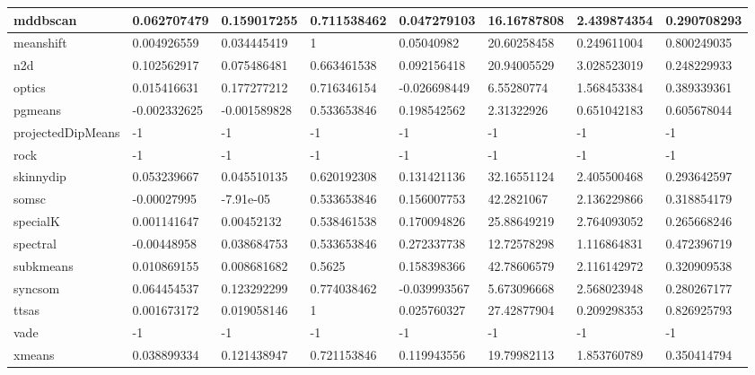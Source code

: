 \begin{table}[H]
\begin{tabular}{|l|l|l|l|l|l|l|l|}
mddbscan & 0.062707479 & 0.159017255 & 0.711538462 & 0.047279103 & 16.16787808 & 2.439874354 & 0.290708293 \\
\hline
meanshift & 0.004926559 & 0.034445419 & 1 & 0.05040982 & 20.60258458 & 0.249611004 & 0.800249035 \\
\hline
n2d & 0.102562917 & 0.075486481 & 0.663461538 & 0.092156418 & 20.94005529 & 3.028523019 & 0.248229933 \\
\hline
optics & 0.015416631 & 0.177277212 & 0.716346154 & -0.026698449 & 6.55280774 & 1.568453384 & 0.389339361 \\
\hline
pgmeans & -0.002332625 & -0.001589828 & 0.533653846 & 0.198542562 & 2.31322926 & 0.651042183 & 0.605678044 \\
\hline
projectedDipMeans & -1 & -1 & -1 & -1 & -1 & -1 & -1 \\
\hline
rock & -1 & -1 & -1 & -1 & -1 & -1 & -1 \\
\hline
skinnydip & 0.053239667 & 0.045510135 & 0.620192308 & 0.131421136 & 32.16551124 & 2.405500468 & 0.293642597 \\
\hline
somsc & -0.00027995 & -7.91e-05 & 0.533653846 & 0.156007753 & 42.2821067 & 2.136229866 & 0.318854179 \\
\hline
specialK & 0.001141647 & 0.00452132 & 0.538461538 & 0.170094826 & 25.88649219 & 2.764093052 & 0.265668246 \\
\hline
spectral & -0.00448958 & 0.038684753 & 0.533653846 & 0.272337738 & 12.72578298 & 1.116864831 & 0.472396719 \\
\hline
subkmeans & 0.010869155 & 0.008681682 & 0.5625 & 0.158398366 & 42.78606579 & 2.116142972 & 0.320909538 \\
\hline
syncsom & 0.064454537 & 0.123292299 & 0.774038462 & -0.039993567 & 5.673096668 & 2.568023948 & 0.280267177 \\
\hline
ttsas & 0.001673172 & 0.019058146 & 1 & 0.025760327 & 27.42877904 & 0.209298353 & 0.826925793 \\
\hline
vade & -1 & -1 & -1 & -1 & -1 & -1 & -1 \\
\hline
xmeans & 0.038899334 & 0.121438947 & 0.721153846 & 0.119943556 & 19.79982113 & 1.853760789 & 0.350414794 \\
\hline
\end{tabular}
\end{table}